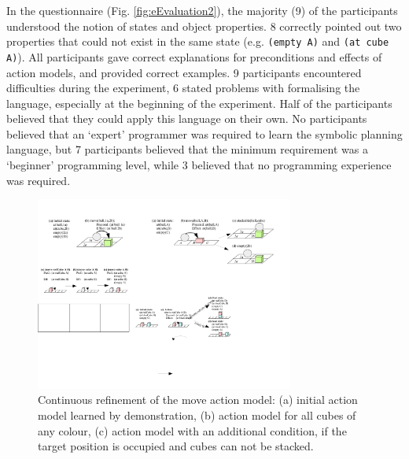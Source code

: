In the questionnaire (Fig. \ref{fig:eEvaluation2}), the majority (9) of the participants understood the notion of states and object properties. 8 correctly pointed out two properties that could not exist in the same state (e.g. \texttt{(empty A)} and \texttt{(at cube A)}).
All participants gave correct explanations for preconditions and effects of action models, and provided correct examples.
9 participants encountered difficulties during the experiment, 6 stated problems with formalising the language, especially at the beginning of the experiment.
Half of the participants believed that they could apply this language on their own.
No participants believed that an `expert' programmer was required to learn the symbolic planning language, but 7 participants believed that the minimum requirement was a `beginner' programming level, while 3 believed that no programming experience was required.

 \begin{figure}[t]
  \centering
  \includegraphics[width=8.5cm]{figures/scenarios-exp2}
  \caption{Continuous refinement of the move action model: (a) initial action model learned by demonstration, (b) action model for all cubes of any colour, (c) action model with an additional condition, if the target position is occupied and cubes can not be stacked.}
  \label{fig:scenarios-exp2}
 \end{figure}